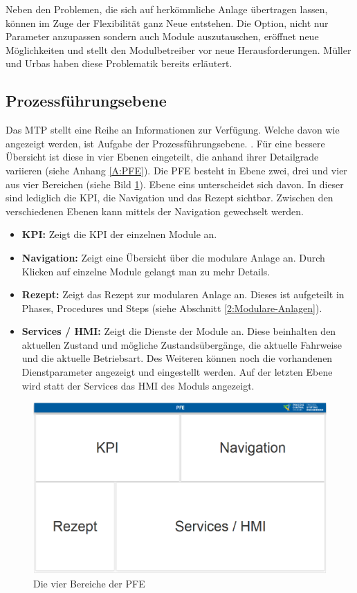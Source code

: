 Neben den Problemen, die sich auf herkömmliche Anlage übertragen lassen, können im Zuge der Flexibilität ganz Neue entstehen. Die Option, nicht nur Parameter anzupassen sondern auch Module auszutauschen, eröffnet neue Möglichkeiten und stellt den Modulbetreiber vor neue Herausforderungen. Müller und Urbas \cite{Muller2017} haben diese Problematik bereits erläutert.

\subsection{Prozessführungsebene}
\label{3:PFE}
Das MTP stellt eine Reihe an Informationen zur Verfügung. Welche davon wie angezeigt werden, ist Aufgabe der Prozessführungsebene.  . Für eine bessere Übersicht ist diese in vier Ebenen eingeteilt, die anhand ihrer Detailgrade variieren (siehe Anhang \ref{A:PFE}). Die PFE besteht in Ebene zwei, drei und vier aus vier Bereichen (siehe Bild \ref{pic:Bereiche-PFE}). Ebene eins unterscheidet sich davon. In dieser sind lediglich die KPI, die Navigation und das Rezept sichtbar. Zwischen den verschiedenen Ebenen kann mittels der Navigation gewechselt werden.
\begin{itemize}
\item \textbf{KPI:} Zeigt die KPI der einzelnen Module an.
\item \textbf{Navigation:} Zeigt eine Übersicht über die modulare Anlage an. Durch Klicken auf einzelne Module gelangt man zu mehr Details.
\item \textbf{Rezept:} Zeigt das Rezept zur modularen Anlage an. Dieses ist aufgeteilt in Phases, Procedures und Steps (siehe Abschnitt \ref{2:Modulare-Anlagen}).
\item \textbf{Services / HMI:} Zeigt die Dienste der Module an. Diese beinhalten den aktuellen Zustand und mögliche Zustandsübergänge, die aktuelle Fahrweise und die aktuelle Betriebsart. Des Weiteren können noch die vorhandenen Dienstparameter angezeigt und eingestellt werden. Auf der letzten Ebene wird statt der Services das HMI des Moduls angezeigt.
\end{itemize}
\begin{figure}[h]
\centering
\includegraphics[scale=0.25]{DA_files/Bilder/Analyse/PFE-Bereiche.png}
\caption{Die vier Bereiche der PFE}
\label{pic:Bereiche-PFE}
\end{figure}



